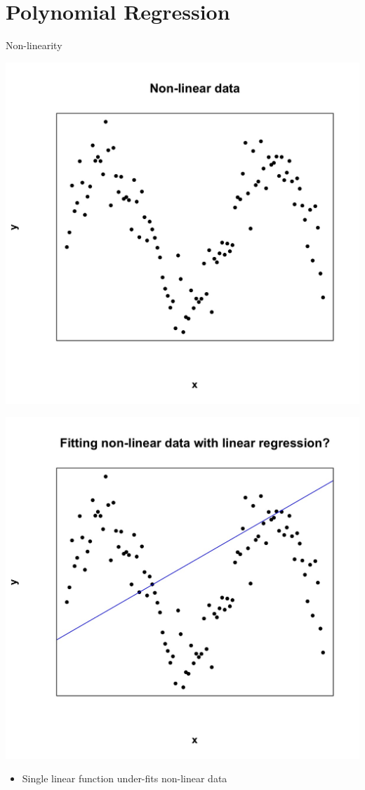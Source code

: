 \documentclass[english]{beamer}
\newcommand{\alertblue}[1]{{\color{blue}#1}}
\begin{document}
\section{Polynomial Regression}
\begin{frame}{Non-linearity}
\begin{minipage}{0.49\textwidth}
        \centering
        \includegraphics[width=\linewidth]{images/Non-linear data.jpeg} 
    \end{minipage}
    \hfill
    \begin{minipage}{0.49\textwidth}
        \centering
        \includegraphics[width=\linewidth]{images/not_accurate_non-linear.jpeg} 
    \end{minipage}
    \begin{itemize}
        \item Single linear function \alertblue{under-fits} non-linear data
    \end{itemize}
\end{frame}
\end{document}
